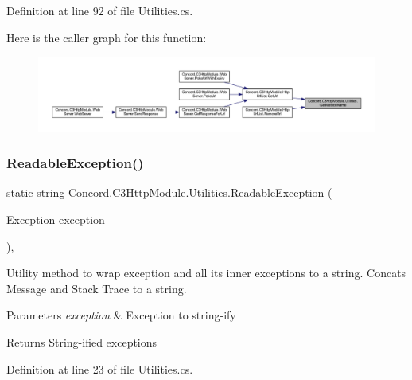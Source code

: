 Definition at line 92 of file Utilities.\+cs.

Here is the caller graph for this function\+:
\nopagebreak
\begin{figure}[H]
\begin{center}
\leavevmode
\includegraphics[width=350pt]{class_concord_1_1_c3_http_module_1_1_utilities_a28cf8fb31878e9955f8f2f9489e1c4a5_icgraph}
\end{center}
\end{figure}
\mbox{\label{class_concord_1_1_c3_http_module_1_1_utilities_aadfb9271c63b98ed7754cfb8e07072e2}} 
\subsubsection{\texorpdfstring{ReadableException()}{ReadableException()}}
{\footnotesize\ttfamily static string Concord.\+C3\+Http\+Module.\+Utilities.\+Readable\+Exception (\begin{DoxyParamCaption}\item[{Exception}]{exception }\end{DoxyParamCaption})\hspace{0.3cm}{\ttfamily [inline]}, {\ttfamily [static]}}



Utility method to wrap exception and all its inner exceptions to a string. Concats Message and Stack Trace to a string. 


\begin{DoxyParams}{Parameters}
{\em exception} & Exception to string-\/ify\\
\hline
\end{DoxyParams}
\begin{DoxyReturn}{Returns}
String-\/ified exceptions
\end{DoxyReturn}


Definition at line 23 of file Utilities.\+cs.

